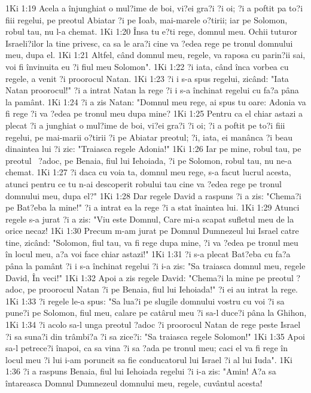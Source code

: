 1Ki 1:19  Acela a înjunghiat o mul?ime de boi, vi?ei gra?i ?i oi; ?i a poftit pa to?i fiii regelui, pe preotul Abiatar ?i pe Ioab, mai-marele o?tirii; iar pe Solomon, robul tau, nu l-a chemat.
1Ki 1:20  Însa tu e?ti rege, domnul meu. Ochii tuturor Israeli?ilor la tine privesc, ca sa le ara?i cine va ?edea rege pe tronul domnului meu, dupa el.
1Ki 1:21  Altfel, când domnul meu, regele, va raposa cu parin?ii sai, voi fi învinuita eu ?i fiul meu Solomon".
1Ki 1:22  ?i iata, când înca vorbea cu regele, a venit ?i proorocul Natan.
1Ki 1:23  ?i i s-a spus regelui, zicând: "Iata Natan proorocul!" ?i a intrat Natan la rege ?i i s-a închinat regelui cu fa?a pâna la pamânt.
1Ki 1:24  ?i a zis Natan: "Domnul meu rege, ai spus tu oare: Adonia va fi rege ?i va ?edea pe tronul meu dupa mine?
1Ki 1:25  Pentru ca el chiar astazi a plecat ?i a junghiat o mul?ime de boi, vi?ei gra?i ?i oi; ?i a poftit pe to?i fiii regelui, pe mai-marii o?tirii ?i pe Abiatar preotul; ?i, iata, ei manânca ?i beau dinaintea lui ?i zic: "Traiasca regele Adonia!"
1Ki 1:26  Iar pe mine, robul tau, pe preotul  ?adoc, pe Benaia, fiul lui Iehoiada, ?i pe Solomon, robul tau, nu ne-a chemat.
1Ki 1:27  ?i daca cu voia ta, domnul meu rege, s-a facut lucrul acesta, atunci pentru ce tu n-ai descoperit robului tau cine va ?edea rege pe tronul domnului meu, dupa el?"
1Ki 1:28  Dar regele David a raspuns ?i a zis: "Chema?i pe Bat?eba la mine!" ?i a intrat ea la rege ?i a stat înaintea lui.
1Ki 1:29  Atunci regele s-a jurat ?i a zis: "Viu este Domnul, Care mi-a scapat sufletul meu de la orice necaz!
1Ki 1:30  Precum m-am jurat pe Domnul Dumnezeul lui Israel catre tine, zicând: "Solomon, fiul tau, va fi rege dupa mine, ?i va ?edea pe tronul meu în locul meu, a?a voi face chiar astazi!"
1Ki 1:31  ?i s-a plecat Bat?eba cu fa?a pâna la pamânt ?i i s-a închinat regelui ?i i-a zis: "Sa traiasca domnul meu, regele David, În veci!"
1Ki 1:32  Apoi a zis regele David: "Chema?i la mine pe preotul ?adoc, pe proorocul Natan ?i pe Benaia, fiul lui Iehoiada!" ?i ei au intrat la rege.
1Ki 1:33  ?i regele le-a spus: "Sa lua?i pe slugile domnului vostru cu voi ?i sa pune?i pe Solomon, fiul meu, calare pe catârul meu ?i sa-l duce?i pâna la Ghihon,
1Ki 1:34  ?i acolo sa-l unga preotul ?adoc ?i proorocul Natan de rege peste Israel ?i sa suna?i din trâmbi?a ?i sa zice?i: "Sa traiasca regele Solomon!"
1Ki 1:35  Apoi sa-l petrece?i înapoi, ca sa vina ?i sa ?ada pe tronul meu; caci el va fi rege în locul meu ?i lui i-am poruncit sa fie conducatorul lui Israel ?i al lui Iuda".
1Ki 1:36  ?i a raspuns Benaia, fiul lui Iehoiada regelui ?i i-a zis: "Amin! A?a sa întareasca Domnul Dumnezeul domnului meu, regele, cuvântul acesta!
